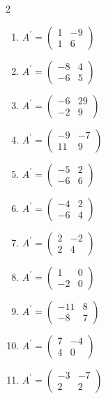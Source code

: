 \begin{multicols}{2}
\begin{enumerate}[label=\arabic*., leftmargin=*, itemsep=1pt]
\item $A^{\prime}=\left(\begin{smallmatrix}1 & -9\\ 1 & 6\end{smallmatrix}\right)$
\item $A^{\prime}=\left(\begin{smallmatrix}-8 & 4\\ -6 & 5\end{smallmatrix}\right)$
\item $A^{\prime}=\left(\begin{smallmatrix}-6 & 29\\ -2 & 9\end{smallmatrix}\right)$
\item $A^{\prime}=\left(\begin{smallmatrix}-9 & -7\\ 11 & 9\end{smallmatrix}\right)$
\item $A^{\prime}=\left(\begin{smallmatrix}-5 & 2\\ -6 & 6\end{smallmatrix}\right)$
\item $A^{\prime}=\left(\begin{smallmatrix}-4 & 2\\ -6 & 4\end{smallmatrix}\right)$
\item $A^{\prime}=\left(\begin{smallmatrix}2 & -2\\ 2 & 4\end{smallmatrix}\right)$
\item $A^{\prime}=\left(\begin{smallmatrix}1 & 0\\ -2 & 0\end{smallmatrix}\right)$
\item $A^{\prime}=\left(\begin{smallmatrix}-11 & 8\\ -8 & 7\end{smallmatrix}\right)$
\item $A^{\prime}=\left(\begin{smallmatrix}7 & -4\\ 4 & 0\end{smallmatrix}\right)$
\item $A^{\prime}=\left(\begin{smallmatrix}-3 & -7\\ 2 & 2\end{smallmatrix}\right)$

\end{enumerate}
\end{multicols}
